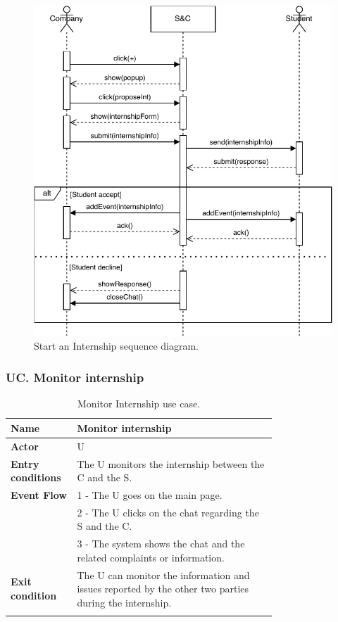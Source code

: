 \begin{figure}[H]
    \begin{center}
        \includegraphics[width=\linewidth]{Images/SequenceDiagram/StartInternSD.pdf}
        \caption{Start an Internship sequence diagram.}
        \label{fig:start_internship_seqdiag}%
    \end{center}
\end{figure}


\subsubsection*{UC\cuc . Monitor internship}
\begin{center}
    \begin{longtable}{|l|p{0.75\linewidth}|}
        \hline
        \textbf{Name}               & Monitor internship\\
        \hline
        \textbf{Actor}              & U\\
        \hline
        \textbf{Entry conditions}   & The U monitors the internship between the C and the S.\\
        \hline
        \textbf{Event Flow}         & 1 - The U goes on the main page. \\
        & 2 - The U clicks on the chat regarding the S and the C. \\
        & 3 - The system shows the chat and the related complaints or information. \\
        \hline
        \textbf{Exit condition}   & The U can monitor the information and issues reported by the other two parties during the internship. \\       
        \hline
        \caption{Monitor Internship use case.}
        \label{tab: monitor_internship_use_case}
    \end{longtable}
\end{center}


